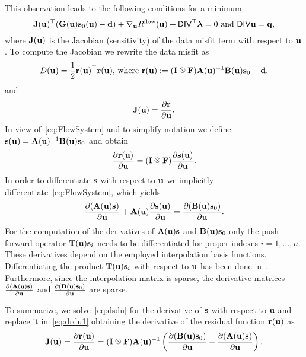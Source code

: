 \documentclass[english]{siamltex}
\newcommand {\bu}   { {\bf u} }          			%
\newcommand {\bfd}   { {\bf d} }
\newcommand {\bfs}   { {\bf s} }
\newcommand {\bfu}   { {\bf u} }
\newcommand {\bfq}   { {\bf q} }
\newcommand {\bfr}    {{\bf{r}}}
\newcommand {\bflambda}    {{\boldsymbol{\lambda}}}
\newcommand{\hf}		 {\frac12}
\renewcommand{\grad}{\ensuremath {{\bf{ \nabla}}}}
\newcommand{\bA}  { {\bf A} }      %
\newcommand{\bB}  { {\bf B} }      %
\newcommand{\bI}  { {\bf I} }      %
\newcommand{\bF}  { {\bf F} }      %
\newcommand{\bG}  { {\bf G} }      %
\newcommand{\bT}  {\text{{\bf T}}} %
\newcommand{\bfJ}  {\text{{\bf J}}} %
\newcommand{\DIVh}   {{\textsf{DIV}}}  %
\def\kronecker{\raisebox{1pt}{\ensuremath{\:\otimes\:}}}
\begin{document}
This observation leads to the following conditions for a minimum
\begin{equation}
\label{lagdiff}
 \bfJ(\bfu)^{\top}(\bG(\bu) \bfs_0(\bfu)  - \bfd)  + \grad_{\bfu} R^{\rm flow}(\bfu)
+ \DIVh^{\top} \bflambda = 0 \text{ and }  \DIVh \bfu = \bfq,
\end{equation}
where $\bfJ(\bfu)$ is the Jacobian (sensitivity) of the data misfit term with respect to $\bfu$.
To compute the Jacobian we rewrite the data misfit as
\begin{equation}
	D(\bu) = \hf \bfr(\bu)^{\top} \bfr(\bu) \text{, where } \bfr(\bu):=  (\bI \kronecker \bF)  \bA(\bu)^{-1} \bB(\bu) \bfs_0- {\bf d}.
\end{equation}
and
$$ \bfJ(\bfu) =  \frac{\partial \bfr}{\partial \bu}. $$
In view of~\eqref{eq:FlowSystem} and to simplify notation we define $\bfs(\bu)= \bA(\bu)^{-1} \bB(\bu) \bfs_0$ and obtain
\begin{equation}\label{eq:drdu1}
	\frac{\partial \bfr(\bu)}{\partial \bu} = (\bI\kronecker \bF)\frac{\partial \bfs(\bu)}{\partial \bu}.
\end{equation}
In order to differentiate $\bfs$ with respect to $\bu$ we implicitly differentiate~\eqref{eq:FlowSystem}, which yields
\begin{equation}\label{eq:dsdu}
	\frac{\partial (\bA(\bu)\bfs)}{\partial \bu}  + \bA(\bu) \frac{\partial \bfs(\bu)}{\partial \bu} = \frac{\partial (\bB(\bu) \bfs_{0})}{\partial \bu}. 
\end{equation} 
For the computation of the derivatives of $\bA(\bfu)\bfs$ and $\bB(\bfu)\bfs_{0}$ 
only the push forward operator $\bT(\bu) \bfs_i$ needs to be differentiated for proper indexes $i=1,\hdots,n$. These derivatives depend on the employed interpolation basis functions. 
Differentiating the product $\bT(\bu) \bfs_i$ with respect to $\bfu$ has been done in~\cite{CHN06}.
Furthermore, since the interpolation matrix is sparse, the derivative matrices $\frac{\partial (\bA(\bu)\bfs)}{\partial \bu}$ and $\frac{\partial (\bB(\bu) \bfs_{0})}{\partial \bu}$ are sparse.


To summarize, we solve~\eqref{eq:dsdu} for the derivative of $\bfs$ with respect to $\bu$ 
and replace it in~\eqref{eq:drdu1} obtaining the derivative of the residual function $\bfr(\bu)$ as
\begin{equation}\label{eq:dr}
\bfJ(\bfu) =	\frac{\partial \bfr(\bu)}{\partial \bu} = (\bI\kronecker \bF) \bA(\bu)^{-1} \left(  \frac{\partial(\bB(\bu) \bfs_{0})}{\partial \bu}  -\frac{\partial (\bA(\bu)\bfs)}{\partial \bu} \right). 
\end{equation}
\end{document}
